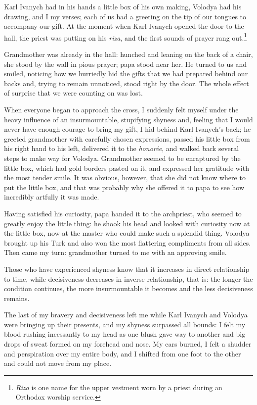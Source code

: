 Karl Ivanych had in his hands a little box of his own making, Volodya had his drawing, and I my verses; each of us had a greeting on the tip of our tongues to accompany our gift. At the moment when Karl Ivanych opened the door to the hall, the priest was putting on his \textit{riza}, and the first sounds of prayer rang out.\footnote{\textit{Riza} is one name for the upper vestment worn by a priest during an Orthodox worship service.}

Grandmother was already in the hall: hunched and leaning on the back of a chair, she stood by the wall in pious prayer; papa stood near her. He turned to us and smiled, noticing how we hurriedly hid the gifts that we had prepared behind our backs and, trying to remain unnoticed, stood right by the door. The whole effect of surprise that we were counting on was lost.

When everyone began to approach the cross, I suddenly felt myself under the heavy influence of an insurmountable, stupifying shyness and, feeling that I would never have enough courage to bring my gift, I hid behind Karl Ivanych's back; he greeted grandmother with carefully chosen expressions, passed his little box from his right hand to his left, delivered it to the \textit{honor\'ee}, and walked back several steps to make way for Volodya. Grandmother seemed to be enraptured by the little box, which had gold borders pasted on it, and expressed her gratitude with the most tender smile. It was obvious, however, that she did not know where to put the little box, and that was probably why she offered it to papa to see how incredibly artfully it was made.

Having satisfied his curiosity, papa handed it to the archpriest, who seemed to greatly enjoy the little thing: he shook his head and looked with curiosity now at the little box, now at the master who could make such a splendid thing. Volodya brought up his Turk and also won the most flattering compliments from all sides. Then came my turn: grandmother turned to me with an approving smile.

Those who have experienced shyness know that it increases in direct relationship to time, while decisiveness decreases in inverse relationship, that is: the longer the condition continues, the more insurmountable it becomes and the less decisiveness remains.

The last of my bravery and decisiveness left me while Karl Ivanych and Volodya were bringing up their presents, and my shyness surpassed all bounds: I felt my blood rushing incessantly to my head as one blush gave way to another and big drops of sweat formed on my forehead and nose. My ears burned, I felt a shudder and perspiration over my entire body, and I shifted from one foot to the other and could not move from my place.

